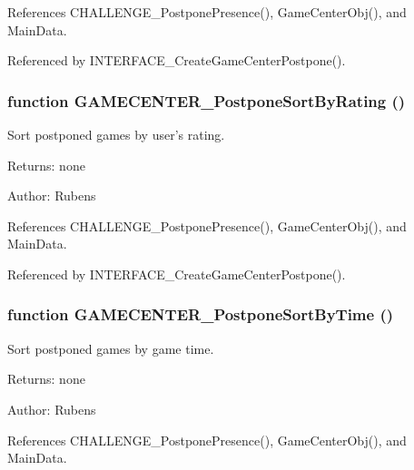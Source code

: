 References CHALLENGE\_\-PostponePresence(), GameCenterObj(), and MainData.

Referenced by INTERFACE\_\-CreateGameCenterPostpone().
\subsubsection[GAMECENTER\_\-PostponeSortByRating]{\setlength{\rightskip}{0pt plus 5cm}function GAMECENTER\_\-PostponeSortByRating ()}\label{gamecenter_2gamecenter_8js_7f42b67ff2dfa2f21f333dd3df64409f}


Sort postponed games by user's rating. 

\begin{Desc}
\item[Returns:]none \end{Desc}
\begin{Desc}
\item[Author:]Rubens \end{Desc}


References CHALLENGE\_\-PostponePresence(), GameCenterObj(), and MainData.

Referenced by INTERFACE\_\-CreateGameCenterPostpone().
\subsubsection[GAMECENTER\_\-PostponeSortByTime]{\setlength{\rightskip}{0pt plus 5cm}function GAMECENTER\_\-PostponeSortByTime ()}\label{gamecenter_2gamecenter_8js_05617cef202ecfced990a76c922ed6c3}


Sort postponed games by game time. 

\begin{Desc}
\item[Returns:]none \end{Desc}
\begin{Desc}
\item[Author:]Rubens \end{Desc}


References CHALLENGE\_\-PostponePresence(), GameCenterObj(), and MainData.

